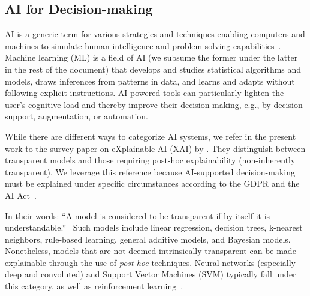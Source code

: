 \subsection{AI for Decision-making}
\label{subsec:AI}
AI is a generic term for various strategies and techniques enabling computers and machines to simulate human intelligence and problem-solving capabilities~\cite{russell_artificial_2016}.
Machine learning (ML) is a field of AI (we subsume the former under the latter in the rest of the document) that develops and studies statistical algorithms and models, draws inferences from patterns in data, and learns and adapts without following explicit instructions.
AI-powered tools can particularly lighten the user's cognitive load and thereby improve their decision-making, e.g., by decision support, augmentation, or automation. 

While there are different ways to categorize AI systems, we refer in the present work to the survey paper on eXplainable AI (XAI) by \citet{arrieta_explainable_2019}.
They distinguish between transparent models and those requiring post-hoc explainability (non-inherently transparent).
We leverage this reference because AI-supported decision-making must be explained under specific circumstances according to the GDPR and the AI Act~\cite{panigutti_role_2023}.

In their words: ``A model is considered to be transparent if by itself it is understandable.''~\cite{arrieta_explainable_2019}
Such models include linear regression, decision trees, k-nearest neighbors, rule-based learning, general additive models, and Bayesian models.
Nonetheless, models that are not deemed intrinsically transparent can be made explainable through the use of \textit{post-hoc} techniques.
Neural networks (especially deep and convoluted) and Support Vector Machines (SVM) typically fall under this category, as well as reinforcement learning~\cite{puiutta_explainable_2020}.




